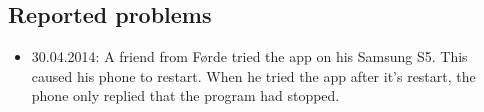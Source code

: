 \subsection{Reported problems}
\begin{itemize}
	\item 30.04.2014: A friend from F\o{}rde tried the app on his Samsung S5. This caused his phone to restart. When he tried the app after it's restart, the phone only replied that the program had stopped.
\end{itemize}